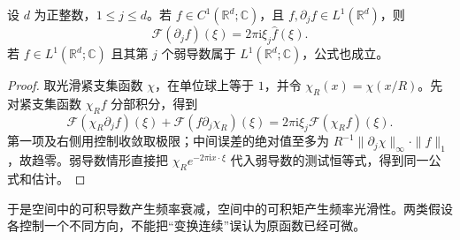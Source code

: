 \begin{proposition}\label{b2:prop:03-derivative}
设 \(d\) 为正整数，\(1\leq j\leq d\)。若 \(f\in C^1(\mathbb R^d;\mathbb C)\)，且 \(f,\partial_jf\in L^1(\mathbb R^d)\)，则
\[
 \mathcal F(\partial_jf)(\xi)=2\pi\mathrm{i}\xi_j\widehat f(\xi).
\]
若 \(f\in L^1(\mathbb R^d;\mathbb C)\) 且其第 \(j\) 个弱导数属于 \(L^1(\mathbb R^d;\mathbb C)\)，公式也成立。
\end{proposition}
\begin{proof}
取光滑紧支集函数 \(\chi\)，在单位球上等于 \(1\)，并令 \(\chi_R(x)=\chi(x/R)\)。先对紧支集函数 \(\chi_Rf\) 分部积分，得到
\[
 \mathcal F(\chi_R\partial_jf)(\xi)
 +\mathcal F(f\partial_j\chi_R)(\xi)
 =2\pi\mathrm{i}\xi_j\mathcal F(\chi_Rf)(\xi).
\]
第一项及右侧用控制收敛取极限；中间误差的绝对值至多为 \(R^{-1}\|\partial_j\chi\|_\infty\cdot\|f\|_1\)，故趋零。弱导数情形直接把 \(\chi_Re^{-2\pi\mathrm{i}x\cdot\xi}\) 代入弱导数的测试恒等式，得到同一公式和估计。
\end{proof}

于是空间中的可积导数产生频率衰减，空间中的可积矩产生频率光滑性。两类假设各控制一个不同方向，不能把“变换连续”误认为原函数已经可微。
